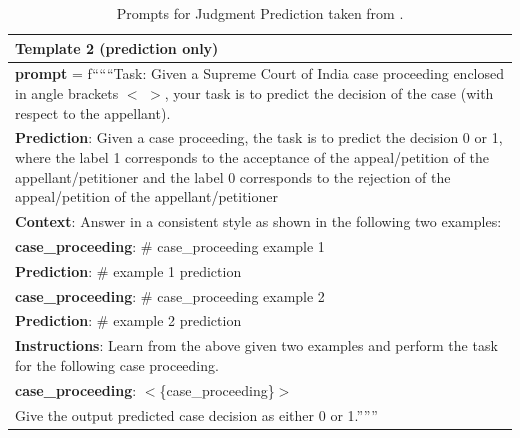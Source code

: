 \begin{table}[h]
\begin{tabular}{|p{}|}
\hline
    {\bf Template 2 (prediction only)}\\
    \hline
   
{\bf prompt} = f``````Task: Given a Supreme Court of India case proceeding enclosed in angle brackets $<$ $>$, your task is to predict the decision of the case (with respect to the appellant).\\


{\bf Prediction}: Given a case proceeding, the task is to predict the decision 0 or 1, where the label 1 corresponds to the acceptance of the appeal/petition of the appellant/petitioner and the label 0 corresponds to the rejection of the appeal/petition of the appellant/petitioner \\


{\bf Context}: Answer in a consistent style as shown in the following two examples: \\


  {\bf case\_proceeding}: \# case\_proceeding example 1\\


  {\bf Prediction}: \# example 1 prediction \\


 


  {\bf case\_proceeding}: \# case\_proceeding example 2\\


  {\bf Prediction}: \# example 2 prediction\\


 


{\bf Instructions}: Learn from the above given two examples and perform the task for the following case proceeding. \\


{\bf case\_proceeding}: $<$\{case\_proceeding\}$>$\\


Give the output predicted case decision as either 0 or 1.''''''\\

\hline

    \end{tabular}
    \caption{Prompts for Judgment Prediction taken from \cite{vats-etal-2023-llms}.}
    \label{tab:judgment_prediction_prompts_few}
\end{table}

